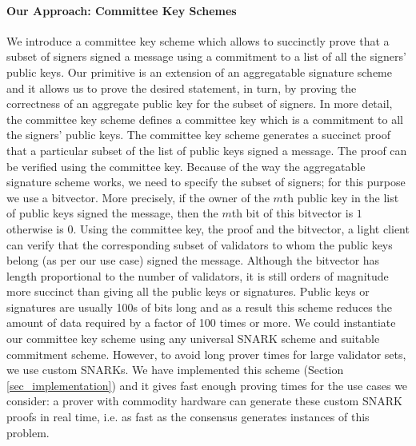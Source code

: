 \paragraph{Our Approach: Committee Key Schemes} We introduce a committee key scheme which allows to succinctly prove that a subset of signers 
signed a message using a commitment to a list of all the signers' public keys. Our primitive is an extension of an aggregatable signature scheme and 
it allows us to prove the desired statement, in turn, by proving the correctness of an aggregate public key for the subset of signers. 
In more detail, the committee key scheme defines a committee key which is a commitment to all the signers' public keys. The committee 
key scheme generates a succinct proof that a particular subset of the list of public keys signed a message. The proof can be verified using the committee key. 
Because of the way the aggregatable signature scheme works, we need to specify the subset of signers; for this purpose we use a bitvector. 
More precisely, if the owner of the $m$th public key in the list of public keys signed the message, then the $m$th bit of this bitvector is $1$ otherwise is $0$.
Using the committee key, the proof and the bitvector, a light client can verify that the corresponding subset of validators to whom the 
public keys belong (as per our use case) signed the message. Although the bitvector has length proportional to the number of validators, it is still orders of magnitude 
more succinct than giving all the public keys or signatures. Public keys or signatures are usually 100s of bits long and as a result this scheme reduces the amount of 
data required by a factor of 100 times or more. We could instantiate our committee key scheme using any universal SNARK scheme and suitable commitment scheme. 
However, to avoid long prover times for large validator sets, we use custom SNARKs. We have implemented this scheme 
(Section \ref{sec_implementation}) and it gives fast enough proving times for the use cases we consider: a prover with 
commodity hardware can generate these custom SNARK proofs in real time, i.e. as fast as the consensus generates instances of this problem.

